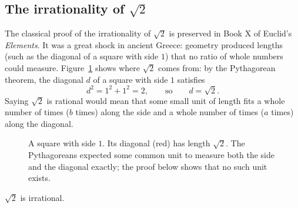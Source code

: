 \subsection{\texorpdfstring{The irrationality of $\sqrt{2}$}{The irrationality of sqrt(2)}}

The classical proof of the irrationality of $\sqrt{2}$ is preserved in Book X of Euclid's \emph{Elements}. It was a great shock in ancient Greece: geometry produced lengths (such as the diagonal of a square with side $1$) that no ratio of whole numbers could measure. Figure~\ref{08:fig-unit-square} shows where $\sqrt{2}$ comes from: by the Pythagorean theorem, the diagonal $d$ of a square with side $1$ satisfies
\[
d^2 = 1^2 + 1^2 = 2, \qquad\text{so}\qquad d = \sqrt{2}.
\]
Saying $\sqrt{2}$ is rational would mean that some small unit of length fits a whole number of times ($b$ times) along the side and a whole number of times ($a$ times) along the diagonal.

\begin{figure}[htbp]
\centering
{}
\caption{A square with side $1$. Its diagonal (red) has length $\sqrt{2}$. The Pythagoreans expected some common unit to measure both the side and the diagonal exactly; the proof below shows that no such unit exists.}
\label{08:fig-unit-square}
\end{figure}

\begin{theorem}
$\sqrt{2}$ is irrational.
\end{theorem}

